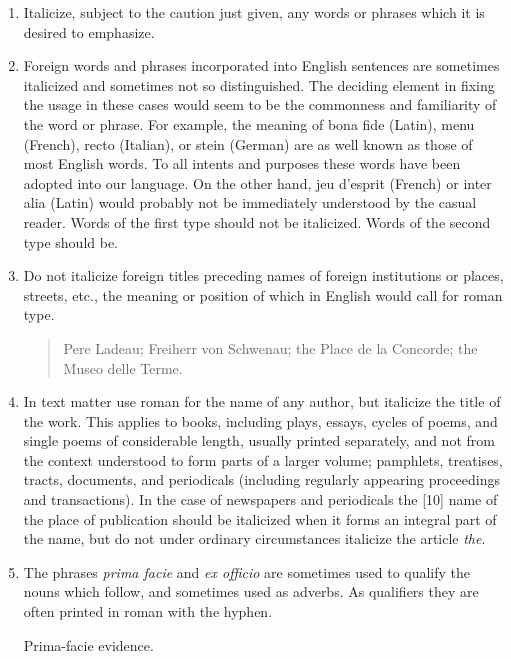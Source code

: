\begin{enumerate}
\item  Italicize, subject to the caution just given, any words or phrases which it is desired to emphasize.

\item Foreign words and phrases incorporated into English sentences are sometimes italicized and sometimes not so distinguished. The deciding element in fixing the usage in these cases would seem to be the commonness and familiarity of the word or phrase. For example, the meaning of bona fide (Latin), menu (French), recto (Italian), or stein (German) are as well known as those of most English words. To all intents and purposes these words have been adopted into our language. On the other hand, jeu d'esprit (French) or inter alia (Latin) would probably not be immediately understood by the casual reader. Words of the first type should not be italicized. Words of the second type should be.

\item Do not italicize foreign titles preceding names of foreign institutions or places, streets, etc., the meaning or position of which in English would call for roman type.
        \begin{quote}
         \noindent Pere Ladeau; Freiherr von Schwenau; the Place de la Concorde; the Museo delle Terme.
       \end{quote}

\item In text matter use roman for the name of any author, but italicize the title of the work. This applies to books, including plays, essays, cycles of poems, and single poems of considerable length, usually printed separately, and not from the context understood to form parts of a larger volume; pamphlets, treatises, tracts, documents, and periodicals (including regularly appearing proceedings and transactions). In the case of newspapers and periodicals the [10] name of the place of publication should be italicized when it forms an integral part of the name, but do not under ordinary circumstances italicize the article \emph{the}.


\item The phrases \textit{prima facie} and \textit{ex officio} are sometimes used to qualify the nouns which follow, and sometimes used as adverbs. As qualifiers they are often printed in roman with the hyphen.

     \hspace*{1em} Prima-facie evidence.


\end{enumerate}
